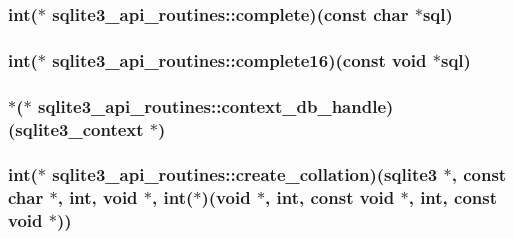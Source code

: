 \hypertarget{structsqlite3__api__routines_a4bd1a90b2a40c58ecc1c2ceb67be48f5}{
\subsubsection[{complete}]{\setlength{\rightskip}{0pt plus 5cm}int($\ast$ sqlite3\-\_\-api\-\_\-routines\-::complete)(const char $\ast${\bf sql})}}\label{structsqlite3__api__routines_a4bd1a90b2a40c58ecc1c2ceb67be48f5}
\hypertarget{structsqlite3__api__routines_ae3e27f61b6c43cf549360f1bb8b3b591}{
\subsubsection[{complete16}]{\setlength{\rightskip}{0pt plus 5cm}int($\ast$ sqlite3\-\_\-api\-\_\-routines\-::complete16)(const void $\ast${\bf sql})}}\label{structsqlite3__api__routines_ae3e27f61b6c43cf549360f1bb8b3b591}
\hypertarget{structsqlite3__api__routines_a2f64d6726587345c6c9f138542f14031}{
\subsubsection[{context\-\_\-db\-\_\-handle}]{$\ast$($\ast$ sqlite3\-\_\-api\-\_\-routines\-::context\-\_\-db\-\_\-handle)({\bf sqlite3\-\_\-context} $\ast$)}}\label{structsqlite3__api__routines_a2f64d6726587345c6c9f138542f14031}
\hypertarget{structsqlite3__api__routines_aed840be5b7cc7add4f21ba88f1981f58}{
\subsubsection[{create\-\_\-collation}]{\setlength{\rightskip}{0pt plus 5cm}int($\ast$ sqlite3\-\_\-api\-\_\-routines\-::create\-\_\-collation)({\bf sqlite3} $\ast$, const char $\ast$, int, void $\ast$, int($\ast$)(void $\ast$, int, const void $\ast$, int, const void $\ast$))}}\label{structsqlite3__api__routines_aed840be5b7cc7add4f21ba88f1981f58}
